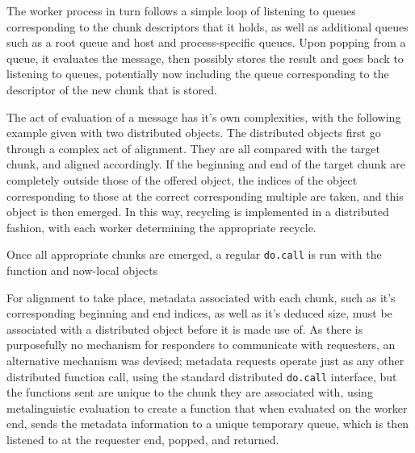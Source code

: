 The worker process in turn follows a simple loop of listening to queues corresponding to the chunk descriptors that it holds, as well as additional queues such as a root queue and host and process-specific queues. 
Upon popping from a queue, it evaluates the message, then possibly stores the result and goes back to listening to queues, potentially now including the queue corresponding to the descriptor of the new chunk that is stored.

The act of evaluation of a message has it's own complexities, with the following example given with two distributed objects.
The distributed objects first go through a complex act of alignment.
They are all compared with the target chunk, and aligned accordingly.
If the beginning and end of the target chunk are completely outside those of the offered object, the indices of the object corresponding to those at the correct corresponding multiple are taken, and this object is then emerged.
In this way, recycling is implemented in a distributed fashion, with each worker determining the appropriate recycle.

Once all appropriate chunks are emerged, a regular \texttt{do.call} is run with the function and now-local objects

For alignment to take place, metadata associated with each chunk, such as it's corresponding beginning and end indices, as well as it's deduced size, must be associated with a distributed object before it is made use of.
As there is purposefully no mechanism for responders to communicate with requesters, an alternative mechanism was devised; metadata requests operate just as any other distributed function call, using the standard distributed \texttt{do.call} interface, but the functions sent are unique to the chunk they are associated with, using metalinguistic evaluation to create a function that when evaluated on the worker end, sends the metadata information to a unique temporary queue, which is then listened to at the requester end, popped, and returned.
